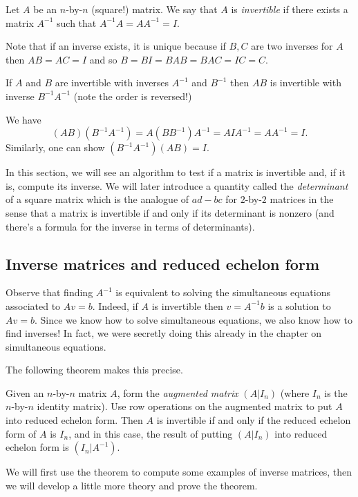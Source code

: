 \documentclass{article}
\begin{document}
\begin{Definition}
Let \(A\) be an \(n\)-by-\(n\) (square!) matrix. We say that \(A\)
is {\em invertible} if there exists a matrix \(A^{-1}\) such that
\(A^{-1}A=AA^{-1}=I\).


\end{Definition}
\begin{Remark}
Note that if an inverse exists, it is unique because if \(B,C\) are
two inverses for \(A\) then \(AB=AC=I\) and so
\(B=BI=BAB=BAC=IC=C\).


\end{Remark}
\begin{Lemma}\label{lma:prodinv}
If \(A\) and \(B\) are invertible with inverses \(A^{-1}\) and
\(B^{-1}\) then \(AB\) is invertible with inverse \(B^{-1}A^{-1}\)
(note the order is reversed!)
\end{Lemma}
\begin{Proof}
We have
\[(AB)(B^{-1}A^{-1})=A(BB^{-1})A^{-1}=AIA^{-1}=AA^{-1}=I.\]
Similarly, one can show \((B^{-1}A^{-1})(AB)=I\). \qedhere


\end{Proof}
In this section, we will see an algorithm to test if a matrix is
invertible and, if it is, compute its inverse. We will later introduce
a quantity called the {\em determinant} of a square matrix which is
the analogue of \(ad-bc\) for \(2\)-by-\(2\) matrices in the sense
that a matrix is invertible if and only if its determinant is nonzero
(and there's a formula for the inverse in terms of determinants).


\subsection{Inverse matrices and reduced echelon form}


Observe that finding \(A^{-1}\) is equivalent to solving the
simultaneous equations associated to \(Av=b\). Indeed, if \(A\) is
invertible then \(v=A^{-1}b\) is a solution to \(Av=b\). Since we know
how to solve simultaneous equations, we also know how to find
inverses! In fact, we were secretly doing this already in the chapter
on simultaneous equations.


The following theorem makes this precise.


\begin{Theorem}\label{thm:invech}
Given an \(n\)-by-\(n\) matrix \(A\), form the {\em augmented
matrix} \((A|I_n)\) (where \(I_n\) is the \(n\)-by-\(n\) identity
matrix). Use row operations on the augmented matrix to put \(A\)
into reduced echelon form. Then \(A\) is invertible if and only if
the reduced echelon form of \(A\) is \(I_n\), and in this case, the
result of putting \((A|I_n)\) into reduced echelon form is
\((I_n|A^{-1})\).


\end{Theorem}
We will first use the theorem to compute some examples of inverse
matrices, then we will develop a little more theory and prove the
theorem.
\end{document}
